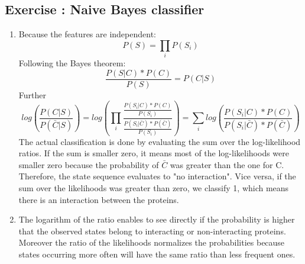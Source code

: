 \documentclass[10pt,a4paper]{article}
\newcommand{\exercise}[1]
{
  \stepcounter{subsection}
  \subsection*{Exercise \thesubsection: #1}

}
\begin{document}
\exercise{Naive Bayes classifier}
\begin{enumerate}
\item Because the features are independent: \begin{equation}P(S) = \prod_{i} P(S_i) \end{equation}
Following the Bayes theorem: \begin{equation} \frac{P(S|C) * P(C)} {P(S)} = P(C|S) \end{equation}
Further \begin{equation} log( \frac{P(C|S)} {P(\bar{C}|S)} ) = log( \prod_{i} \frac{ \frac{P(S_i|C) * P(C)}{P(S_i)} }{ \frac{P(S_i|\bar{C}) * P(\bar{C})}{P(S_i)} } ) = \sum_{i} log( \frac{P(S_i|C) * P(C)}{P(S_i|\bar{C}) * P(\bar{C})} ) \end{equation}
The actual classification is done by evaluating the sum over the log-likelihood ratios. If the sum is smaller zero, it means most of the log-likelihoods were smaller zero because the probability of $\bar{C}$ was greater than the one for C. Therefore, the state sequence evaluates to "no interaction". Vice versa, if the sum over the likelihoods was greater than zero, we classify 1, which means there is an interaction between the proteins.

\item The logarithm of the ratio enables to see directly if the probability is higher that the observed states belong to interacting or non-interacting proteins.
Moreover the ratio of the likelihoods normalizes the probabilities because states occurring more often will have the same ratio than less frequent ones.


\end{enumerate}
\end{document}

